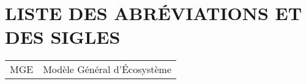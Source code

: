 \chapter*{LISTE DES ABRÉVIATIONS ET DES SIGLES}

\begin{tabular}{ ll } 
 MGE & Modèle Général d'Écosystème \\
 \end{tabular}

